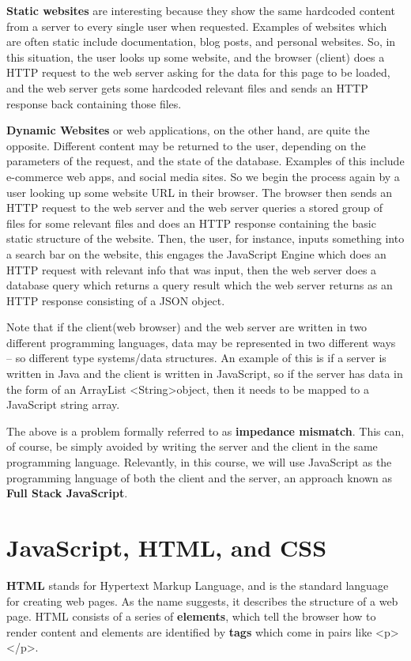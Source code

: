 \documentclass{article}
\begin{document}
\textbf{Static websites} are interesting because they show the same hardcoded content from a server to every single user when requested. Examples of websites which are often static include documentation, blog posts, and personal websites. So, in this situation, the user looks up some website, and the browser (client) does a HTTP request to the web server asking for the data for this page to be loaded, and the web server gets some hardcoded relevant files and sends an HTTP response back containing those files. 

\textbf{Dynamic Websites} or web applications, on the other hand, are quite the opposite. Different content may be returned to the user, depending on the parameters of the request, and the state of the database. Examples of this include e-commerce web apps, and social media sites. So we begin the process again by a user looking up some website URL in their browser. The browser then sends an HTTP request to the web server and the web server queries a stored group of files for some relevant files and does an HTTP response containing the basic static structure of the website. Then, the user, for instance, inputs something into a search bar on the website, this engages the JavaScript Engine which does an HTTP request with relevant info that was input, then the web server does a database query which returns a query result which the web server returns as an HTTP response consisting of a JSON object.

Note that if the client(web browser) and the web server are written in two different programming languages, data may be represented in two different ways -- so different type systems/data structures. An example of this is if a server is written in Java and the client is written in JavaScript, so if the server has data in the form of an ArrayList \textless String\textgreater object, then it needs to be mapped to a JavaScript string array. 

The above is a problem formally referred to as \textbf{impedance mismatch}. This can, of course, be simply avoided by writing the server and the client in the same programming language. Relevantly, in this course, we will use JavaScript as the programming language of both the client and the server, an approach known as \textbf{Full Stack JavaScript}.

\section*{JavaScript, HTML, and CSS}
\textbf{HTML} stands for Hypertext Markup Language, and is the standard language for creating web pages. As the name suggests, it describes the structure of a web page. HTML consists of a series of \textbf{elements}, which tell the browser how to render content and elements are identified by \textbf{tags} which come in pairs like \textless p\textgreater \textless/p\textgreater.
\end{document}
